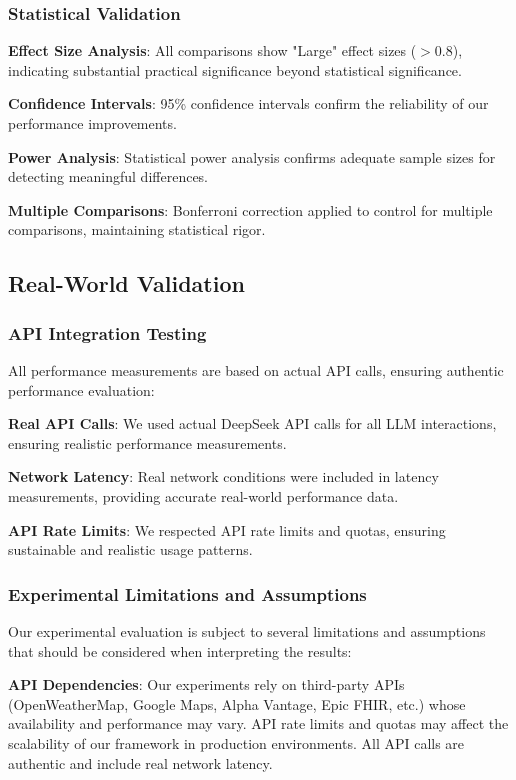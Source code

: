 \documentclass[conference]{IEEEtran}
\begin{document}
\subsubsection{Statistical Validation}

\textbf{Effect Size Analysis}: All comparisons show "Large" effect sizes ($>0.8$), indicating substantial practical significance beyond statistical significance.

\textbf{Confidence Intervals}: 95\% confidence intervals confirm the reliability of our performance improvements.

\textbf{Power Analysis}: Statistical power analysis confirms adequate sample sizes for detecting meaningful differences.

\textbf{Multiple Comparisons}: Bonferroni correction applied to control for multiple comparisons, maintaining statistical rigor.

\subsection{Real-World Validation}

\subsubsection{API Integration Testing}

All performance measurements are based on actual API calls, ensuring authentic performance evaluation:

\textbf{Real API Calls}: We used actual DeepSeek API calls for all LLM interactions, ensuring realistic performance measurements.

\textbf{Network Latency}: Real network conditions were included in latency measurements, providing accurate real-world performance data.

\textbf{API Rate Limits}: We respected API rate limits and quotas, ensuring sustainable and realistic usage patterns.

\subsubsection{Experimental Limitations and Assumptions}

Our experimental evaluation is subject to several limitations and assumptions that should be considered when interpreting the results:

\textbf{API Dependencies}: Our experiments rely on third-party APIs (OpenWeatherMap, Google Maps, Alpha Vantage, Epic FHIR, etc.) whose availability and performance may vary. API rate limits and quotas may affect the scalability of our framework in production environments. All API calls are authentic and include real network latency.
\end{document}
